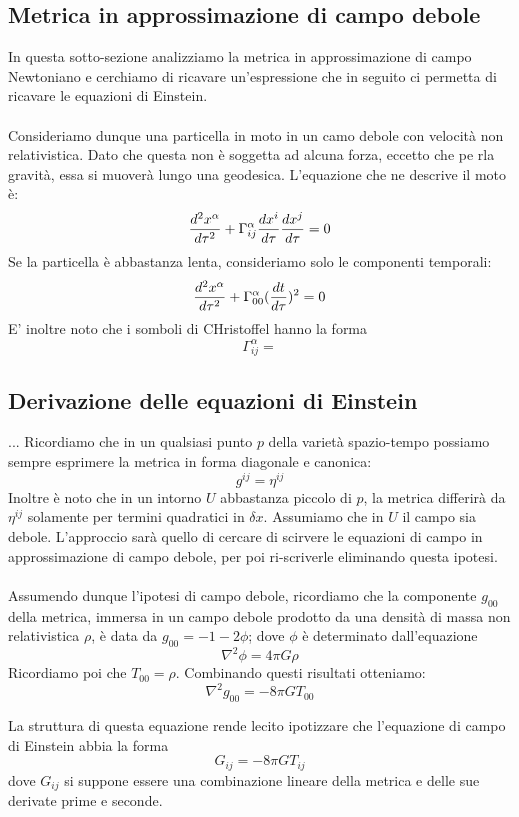 \documentclass[]{report}
\theoremstyle{definition}
\theoremstyle{Theorem}
\theoremstyle{definition}
\theoremstyle{definition}
\theoremstyle{definition}
\begin{document}
\subsection{Metrica in approssimazione di campo debole}
In questa sotto-sezione analizziamo la metrica in approssimazione di campo Newtoniano e cerchiamo di ricavare un'espressione che in seguito ci permetta di ricavare le equazioni di Einstein.\\
\\
Consideriamo dunque una particella in moto in un camo debole con velocità non relativistica. Dato che questa non è soggetta ad alcuna forza, eccetto che pe rla gravità, essa si muoverà lungo una geodesica. L'equazione che ne descrive il moto è:
$${d^2x^\alpha\over d\tau^2}+\Gamma^\alpha_{ij}{dx^i\over d\tau}{dx^j\over d\tau}=0$$ 
Se la particella è abbastanza lenta, consideriamo solo le componenti temporali:
$${d^2x^\alpha\over d\tau^2}+\Gamma^\alpha_{00}({dt\over d\tau})^2=0$$
E' inoltre noto che i somboli di CHristoffel hanno la forma
$$\Gamma_{ij}^\alpha=$$
\subsection{Derivazione delle equazioni di Einstein}
...
Ricordiamo che in un qualsiasi punto $p$ della varietà spazio-tempo possiamo sempre esprimere la metrica in forma diagonale e canonica:
$$g^{ij}=\eta^{ij}$$
Inoltre è noto che in un intorno $U$ abbastanza piccolo di $p$, la metrica differirà da $\eta^{ij}$ solamente per termini quadratici in $\delta x$. Assumiamo che in $U$ il campo sia debole. L'approccio sarà quello di cercare di scirvere le equazioni di campo in approssimazione di campo debole, per poi ri-scriverle eliminando questa ipotesi.\\
\\
Assumendo dunque l'ipotesi di campo debole, ricordiamo che la componente $g_{00}$ della metrica, immersa in un campo debole prodotto da una densità di massa non relativistica $\rho$, è data da $g_{00}=-1-2\phi$; dove $\phi$ è determinato dall'equazione $$\nabla^2\phi=4\pi G\rho$$
Ricordiamo poi che $T_{00}=\rho$. Combinando questi risultati otteniamo:
\begin{equation}\label{Equation 1}
	\nabla^2g_{00}=-8\pi GT_{00}
\end{equation}

La struttura di questa equazione rende lecito ipotizzare che l'equazione di campo di Einstein abbia la forma 
$$G_{ij}=-8\pi GT_{ij}$$
dove $G_{ij}$ si suppone essere una combinazione lineare della metrica e delle sue derivate prime e seconde.
\end{document}
